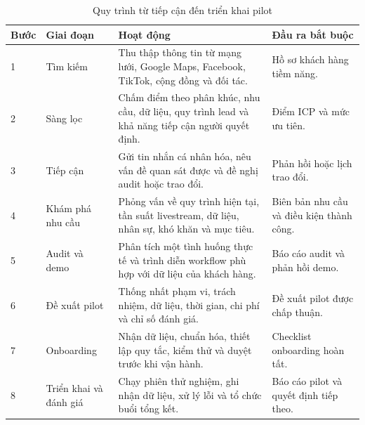 \begin{table}[htbp]
    \centering
    \caption{Quy trình từ tiếp cận đến triển khai pilot}
    \label{tab:first-customer-to-pilot-process}
    \begin{tabular}{
        p{}
        p{}
        p{}
        p{}
    }
        \hline
        \textbf{Bước}
        & \textbf{Giai đoạn}
        & \textbf{Hoạt động}
        & \textbf{Đầu ra bắt buộc} \\
        \hline

        1
        &
        Tìm kiếm
        &
        Thu thập thông tin từ mạng lưới, Google Maps, Facebook, TikTok, cộng đồng và đối tác.
        &
        Hồ sơ khách hàng tiềm năng. \\

        \hline

        2
        &
        Sàng lọc
        &
        Chấm điểm theo phân khúc, nhu cầu, dữ liệu, quy trình lead và khả năng tiếp cận người quyết định.
        &
        Điểm ICP và mức ưu tiên. \\

        \hline

        3
        &
        Tiếp cận
        &
        Gửi tin nhắn cá nhân hóa, nêu vấn đề quan sát được và đề nghị audit hoặc trao đổi.
        &
        Phản hồi hoặc lịch trao đổi. \\

        \hline

        4
        &
        Khám phá nhu cầu
        &
        Phỏng vấn về quy trình hiện tại, tần suất livestream, dữ liệu, nhân sự, khó khăn và mục tiêu.
        &
        Biên bản nhu cầu và điều kiện thành công. \\

        \hline

        5
        &
        Audit và demo
        &
        Phân tích một tình huống thực tế và trình diễn workflow phù hợp với dữ liệu của khách hàng.
        &
        Báo cáo audit và phản hồi demo. \\

        \hline

        6
        &
        Đề xuất pilot
        &
        Thống nhất phạm vi, trách nhiệm, dữ liệu, thời gian, chi phí và chỉ số đánh giá.
        &
        Đề xuất pilot được chấp thuận. \\

        \hline

        7
        &
        Onboarding
        &
        Nhận dữ liệu, chuẩn hóa, thiết lập quy tắc, kiểm thử và duyệt trước khi vận hành.
        &
        Checklist onboarding hoàn tất. \\

        \hline

        8
        &
        Triển khai và đánh giá
        &
        Chạy phiên thử nghiệm, ghi nhận dữ liệu, xử lý lỗi và tổ chức buổi tổng kết.
        &
        Báo cáo pilot và quyết định tiếp theo. \\

        \hline
    \end{tabular}
\end{table}

